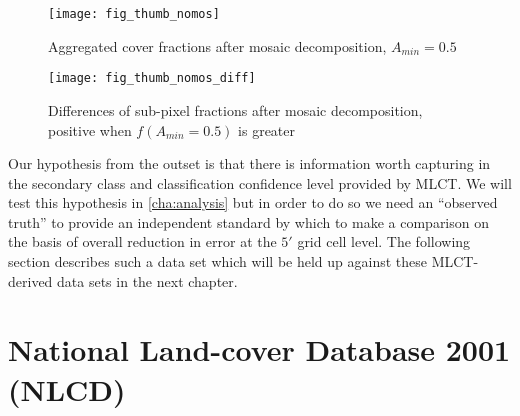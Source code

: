 \begin{figure}[ht]
\centering
  


\texttt{[image: fig\_thumb\_nomos]}
 
\caption{Aggregated cover fractions after mosaic decomposition, $A_{min}=0.5$}
\label{fig:thumb_nomos}
\end{figure} 




\begin{figure}[ht]
\centering
  

\texttt{[image: fig\_thumb\_nomos\_diff]}
 
\caption{Differences of sub-pixel fractions after mosaic
  decomposition, positive when $f(A_{min} = 0.5)$ is greater}
\label{fig:thumb_nomos_diff}
\end{figure} 





Our hypothesis from the outset is that there is information worth
capturing in the secondary class and classification confidence level
provided by MLCT.  We will test this hypothesis in
\autoref{cha:analysis} but in order to do so we need an ``observed
truth'' to provide an independent standard by which to make a
comparison on the basis of overall reduction in error at the $5'$ grid
cell level.  The following section describes such a data set which
will be held up against these MLCT-derived data sets in the next
chapter.




\clearpage

\section{National Land-cover Database 2001 (NLCD)}
\label{sec:nlcd}


